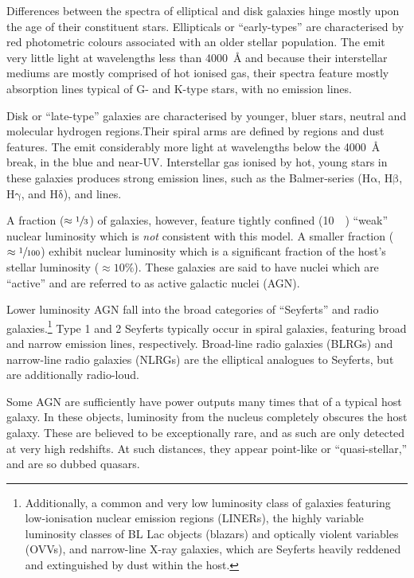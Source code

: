 \documentclass[a4paper,11pt]{article}
\begin{document}
Differences between the spectra of elliptical and disk galaxies hinge mostly upon the age of their constituent stars. Ellipticals or ``early-types'' are characterised by red photometric colours associated with an older stellar population. The emit very little light at wavelengths less than \SI{4000}{\angstrom} and because their interstellar mediums are mostly comprised of hot ionised gas, their spectra feature mostly absorption lines typical of G- and K-type stars, with no emission lines.\cite{Mo_2010}

Disk or ``late-type'' galaxies are characterised by younger, bluer stars, neutral  and molecular  hydrogen regions.Their spiral arms are defined by  regions and dust features. The emit considerably more light at wavelengths below the \SI{4000}{\angstrom} break, in the blue and near-UV. Interstellar gas ionised by hot, young stars in these galaxies produces strong emission lines, such as the Balmer-series ($\mathrm{H\alpha}$, $\mathrm{H\beta}$, $\mathrm{H\gamma}$, and $\mathrm{H\delta}$),  and  lines.\cite{Mo_2010}

A fraction ($\approx \sfrac{1}{3}$) of galaxies, however, feature tightly confined (\SI{10}{\kilo\parsec}) ``weak'' nuclear luminosity which is \textit{not} consistent with this model.\cite{McClure_2019} A smaller fraction ($\approx \sfrac{1}{100}$) exhibit nuclear luminosity which is a significant fraction of the host's stellar luminosity ($\approx 10\%$).\cite{Sparke_2000} These galaxies are said to have nuclei which are ``active'' and are referred to as active galactic nuclei (AGN).\cite{Peterson_1997}

Lower luminosity AGN fall into the broad categories of ``Seyferts'' and radio galaxies.\footnote{Additionally, a common and very low luminosity class of galaxies featuring low-ionisation nuclear emission regions (LINERs), the highly variable luminosity classes of BL Lac objects (blazars) and optically violent variables (OVVs), and narrow-line X-ray galaxies, which are Seyferts heavily reddened and extinguished by dust within the host.} Type 1 and 2 Seyferts typically occur in spiral galaxies, featuring broad and narrow emission lines, respectively. Broad-line radio galaxies (BLRGs) and narrow-line radio galaxies (NLRGs) are the elliptical analogues to Seyferts, but are additionally radio-loud.\cite{Peterson_1997}

Some AGN are sufficiently have power outputs many times that of a typical host galaxy. In these objects, luminosity from the nucleus completely obscures the host galaxy. These are believed to be exceptionally rare, and as such are only detected at very high redshifts. At such distances, they appear point-like or  ``quasi-stellar,'' and are so dubbed quasars.\cite{Peterson_1997}
\end{document}
